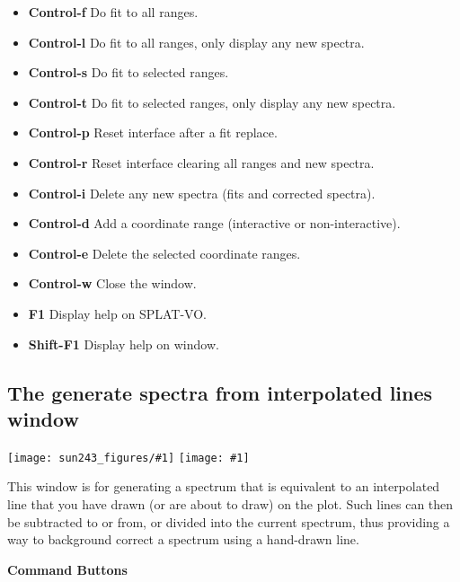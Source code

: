 \documentclass[twoside,11pt,nolof]{starlink}
\providecommand{\SPLAT}{\textsf{SPLAT-VO}}
\providecommand{\mainfigure}[1]
{\begin{center}
    \ifpdf
    \texttt{[image: sun243\_figures/\#1]}
    \else
    \texttt{[image: \#1]}
    \fi
 \end{center}
}
\newcommand{\labelitem}[1]{\textbf{#1}}
\providecommand{\subheading}[1]{\textbf{\large{#1}}}
\begin{document}
\begin{itemize}
\item \labelitem{Control-f} Do fit to all ranges.
\item \labelitem{Control-l} Do fit to all ranges, only display any new spectra.
\item \labelitem{Control-s} Do fit to selected ranges.
\item \labelitem{Control-t} Do fit to selected ranges, only display any new spectra.
\item \labelitem{Control-p} Reset interface after a fit replace.
\item \labelitem{Control-r} Reset interface clearing all ranges and new spectra.
\item \labelitem{Control-i} Delete any new spectra (fits and corrected spectra).

\item \labelitem{Control-d} Add a coordinate range (interactive or non-interactive).
\item \labelitem{Control-e} Delete the selected coordinate ranges.

\item \labelitem{Control-w} Close the window.
\item \labelitem{F1} Display help on \SPLAT.
\item \labelitem{Shift-F1} Display help on window.
\end{itemize}


\newpage
\subsection{The generate spectra from interpolated lines window}

\mainfigure{generateline}

This window is for generating a spectrum that is equivalent to an interpolated
line that you have drawn (or are about to draw) on the plot. Such lines can
then be subtracted to or from, or divided into the current spectrum,
thus providing a way to background correct a spectrum using a hand-drawn line.

\subheading{Command Buttons}
\end{document}
